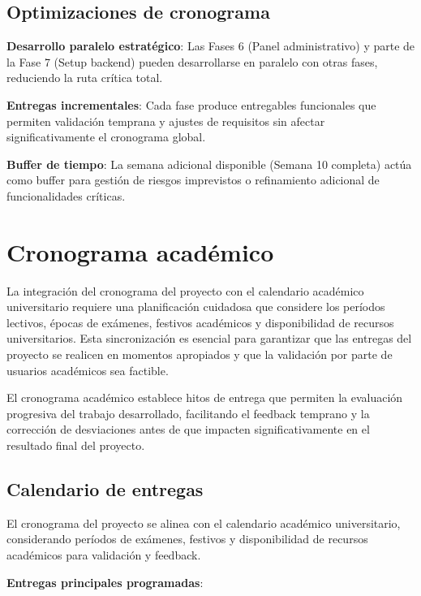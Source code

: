 \documentclass[12pt,a4paper,oneside]{report}
\begin{document}
\subsection{Optimizaciones de
cronograma}\label{optimizaciones-de-cronograma}

\textbf{Desarrollo paralelo estratégico}: Las Fases 6 (Panel
administrativo) y parte de la Fase 7 (Setup backend) pueden
desarrollarse en paralelo con otras fases, reduciendo la ruta crítica
total.

\textbf{Entregas incrementales}: Cada fase produce entregables
funcionales que permiten validación temprana y ajustes de requisitos sin
afectar significativamente el cronograma global.

\textbf{Buffer de tiempo}: La semana adicional disponible (Semana 10
completa) actúa como buffer para gestión de riesgos imprevistos o
refinamiento adicional de funcionalidades críticas.

\section{Cronograma académico}\label{cronograma-acaduxe9mico}

La integración del cronograma del proyecto con el calendario académico
universitario requiere una planificación cuidadosa que considere los
períodos lectivos, épocas de exámenes, festivos académicos y
disponibilidad de recursos universitarios. Esta sincronización es
esencial para garantizar que las entregas del proyecto se realicen en
momentos apropiados y que la validación por parte de usuarios académicos
sea factible.

El cronograma académico establece hitos de entrega que permiten la
evaluación progresiva del trabajo desarrollado, facilitando el feedback
temprano y la corrección de desviaciones antes de que impacten
significativamente en el resultado final del proyecto.

\subsection{Calendario de entregas}\label{calendario-de-entregas}

El cronograma del proyecto se alinea con el calendario académico
universitario, considerando períodos de exámenes, festivos y
disponibilidad de recursos académicos para validación y feedback.

\textbf{Entregas principales programadas}:
\end{document}
